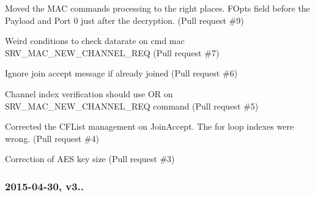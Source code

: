 \begin{DoxyItemize}
\begin{DoxyEnumerate}
\item Moved the M\+AC commands processing to the right places. F\+Opts field before the Payload and Port 0 just after the decryption. (Pull request \#9)
\item Weird conditions to check datarate on cmd mac S\+R\+V\+\_\+\+M\+A\+C\+\_\+\+N\+E\+W\+\_\+\+C\+H\+A\+N\+N\+E\+L\+\_\+\+R\+EQ (Pull request \#7)
\item Ignore join accept message if already joined (Pull request \#6)
\item Channel index verification should use OR on S\+R\+V\+\_\+\+M\+A\+C\+\_\+\+N\+E\+W\+\_\+\+C\+H\+A\+N\+N\+E\+L\+\_\+\+R\+EQ command (Pull request \#5)
\item Corrected the C\+F\+List management on Join\+Accept. The for loop indexes were wrong. (Pull request \#4)
\item Correction of A\+ES key size (Pull request \#3)
\end{DoxyEnumerate}
\end{DoxyItemize}

\subsubsection*{2015-\/04-\/30, v3..}


